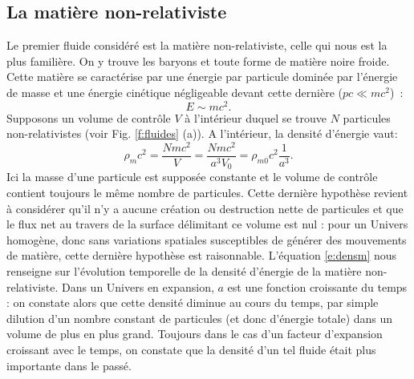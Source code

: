 \subsection{La matière non-relativiste}
Le premier fluide considéré est la matière non-relativiste, celle qui nous est la plus familière. On y trouve les baryons et toute forme de matière noire froide. Cette matière se caractérise par une énergie par particule dominée par l'énergie de masse et une énergie cinétique négligeable devant cette dernière ($pc\ll mc^2$)~:
\begin{equation}
E\sim mc^2.
\end{equation}
Supposons un volume de contrôle $V$ à l'intérieur duquel se trouve $N$ particules non-relativistes (voir Fig. \ref{f:fluides} (a)). A l'intérieur, la densité d'énergie vaut:
\begin{equation}
\rho_m c^2=\frac{Nmc^2}{V}=\frac{Nmc^2}{a^3V_0}=\rho_{m0}c^2\frac{1}{a^3}.
\label{e:densm}
\end{equation}
Ici la masse d'une particule est supposée constante et le volume de contrôle contient toujours le même nombre de particules. Cette dernière hypothèse revient à considérer qu'il n'y a aucune création ou destruction nette de particules et que le flux net au travers de la surface délimitant ce volume est nul : pour un Univers homogène, donc sans variations spatiales susceptibles de générer des mouvements de matière, cette dernière hypothèse est raisonnable. L'équation \ref{e:densm} nous renseigne sur l'évolution temporelle de la densité d'énergie de la matière non-relativiste. Dans un Univers en expansion, $a$ est une fonction croissante du temps :  on constate alors que cette densité diminue au cours du temps, par simple dilution d'un nombre constant de particules (et donc d'énergie totale) dans un volume de plus en plus grand. Toujours dans le cas d'un facteur d'expansion croissant avec le temps, on constate que la densité d'un tel fluide était plus importante dans le passé.

